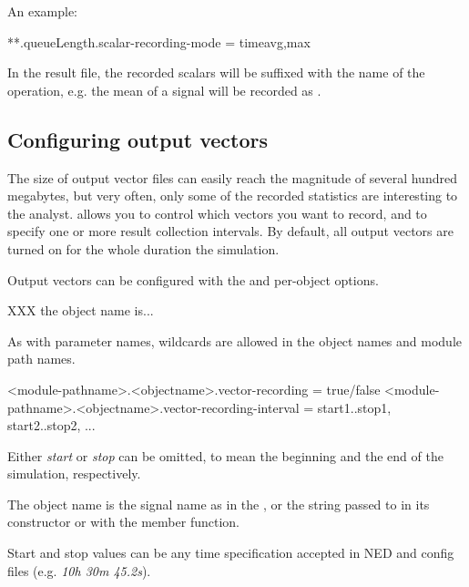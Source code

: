 An example:

\begin{inifile}
**.queueLength.scalar-recording-mode = timeavg,max
\end{inifile}

In the result file, the recorded scalars will be suffixed with the name
of the operation, e.g. the mean of a  signal will
be recorded as .



\subsection{Configuring output vectors}
\label{sec:ch-config-sim:outvectors}

The size of output vector files can easily reach the magnitude of several
hundred megabytes, but very often, only some of the recorded statistics are
interesting to the analyst. {\opp} allows you to control which vectors you
want to record, and to specify one or more result collection intervals. By
default, all output vectors are turned on for the whole duration the
simulation.

Output vectors can be configured with the  and
 per-object options.

XXX the object name is...

As with parameter names, wildcards are allowed in the object
names and module path names.

\begin{inifile}
<module-pathname>.<objectname>.vector-recording = true/false
<module-pathname>.<objectname>.vector-recording-interval = start1..stop1,
                                                       start2..stop2, ...
\end{inifile}

Either \textit{start} or \textit{stop} can be omitted, to mean the
beginning and the end of the simulation, respectively.

The object name is the signal name as in the ,
or the string passed to 
in its constructor or with the  member function.

Start and stop values can be any time specification accepted
in NED and config files (e.g. \textit{10h 30m 45.2s}).

